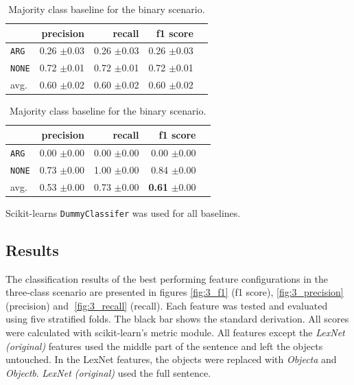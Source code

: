 \begin{table}[!htb]
	\begin{minipage}{.5\linewidth}
		\caption{Random (stratified) baseline for the binary scenario.}
		\label{tbl:binmaj}
		\centering
		      
		\begin{tabularx}{0.97\linewidth}{Xrrrr}
			\toprule
			              & precision                    & recall                       & f1 score                              \\ \midrule 
			\texttt{ARG}  & 0.26 \scriptsize{$\pm$0.03} & 0.26 \scriptsize{$\pm$0.03} & 0.26 \scriptsize{$\pm$0.03}          \\ 
			\texttt{NONE} & 0.72 \scriptsize{$\pm$0.01} & 0.72 \scriptsize{$\pm$0.01} & 0.72 \scriptsize{$\pm$0.01}          \\ 
			avg.       & 0.60 \scriptsize{$\pm$0.02} & 0.60 \scriptsize{$\pm$0.02} & 0.60 \scriptsize{$\pm$0.02} \\ 
			\bottomrule
		\end{tabularx}
		
	\end{minipage}%
	\begin{minipage}{.5\linewidth}
		\centering
		\caption{Majority class baseline for the binary scenario.}
		\label{tbl:binstrat}
		\begin{tabularx}{0.97\linewidth}{Xrrrr}
			\toprule
			              & precision                    & recall                       & f1 score                     \\ \midrule 
			\texttt{ARG}  & 0.00 \scriptsize{$\pm$0.00} & 0.00 \scriptsize{$\pm$0.00} & 0.00 \scriptsize{$\pm$0.00} \\ 
			\texttt{NONE} & 0.73 \scriptsize{$\pm$0.00} & 1.00 \scriptsize{$\pm$0.00} & 0.84 \scriptsize{$\pm$0.00} \\ 
			avg.       & 0.53 \scriptsize{$\pm$0.00} & 0.73 \scriptsize{$\pm$0.00} & \textbf{0.61} \scriptsize{$\pm$0.00} \\ 
			\bottomrule
		\end{tabularx}
	\end{minipage} 
\end{table}
Scikit-learns \texttt{DummyClassifer} was used for all baselines.

\subsection{Results}
\label{sec:3_results}
The classification results of the best performing feature configurations in the three-class scenario are presented in figures \ref{fig:3_f1} (f1 score), \ref{fig:3_precision} (precision) and \ref{fig:3_recall} (recall). Each feature was tested and evaluated using five stratified folds. The black bar shows the standard derivation. All scores were calculated with scikit-learn's metric module. All features except the \emph{LexNet (original)} features used the middle part of the sentence and left the objects untouched. In the LexNet features, the objects were replaced with \emph{Objecta} and \emph{Objectb}. \emph{LexNet (original)} used the full sentence.

